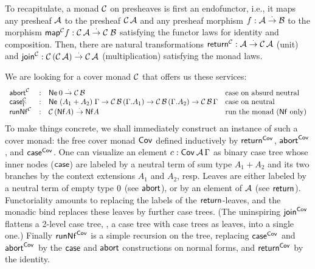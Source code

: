 \documentclass[a4paper,USenglish,cleveref, autoref]{lipics-v2019}
\begin{document}
To recapitulate, a monad $\C$ on presheaves is first an endofunctor,
i.e., it maps any presheaf $\A$ to the presheaf $\C\,\A$ and any
presheaf morphism $f : \A \todot \B$ to the morphism
$\tmap[\C]f: \C\,\A \todot \C\;\B$ satisfying the functor laws for
identity and composition.  Then, there are natural transformations
$\treturn[\C] : \A \todot \C\,\A$ (unit) and
$\tjoin[\C] : \C\,(\C\,\A) \todot \C\,\A$ (multiplication)
satisfying
the monad laws.

We are looking for a cover monad $\C$ that
offers us these services:
\[
\begin{array}{lcl@{\quad}l}
\tabort^\C & : & \tNe\, \tyzero \todot \C\,\B
  & \mbox{case on absurd neutral} \\
\tcase^\C_\Gamma & : & \Ne {(A_1 + A_2)} \Gamma
  \to \C\,\B\,(\cext \Gamma {A_1})
  \to \C\,\B\,(\cext \Gamma {A_2})
  \to \C\,\B\,\Gamma
  & \mbox{case on neutral} \\
\trunNf[\C] & : & \C\,(\tNf A) \todot \tNf A
  & \mbox{run the monad ($\tNf$ only)} \\
\end{array}
\]
To make things concrete,
we shall immediately construct an instance of such a cover monad:
the free cover monad
$\Cov$ defined inductively by $\treturn[\Cov]$, $\tabort^{\Cov}$, and
$\tcase^{\Cov}$.  One can visualize an element $c : \Cov\,\A\,\Gamma$ as
binary case tree whose inner nodes ($\tcase$) are labeled by a neutral term
of sum type $A_1+A_2$ and its two branches by the context extensions $A_1$
and $A_2$, resp.  Leaves are either
labeled by a neutral term of empty type $\tyzero$ (see $\tabort$),
or by an element of $\A$ (see $\treturn$).  Functoriality amounts to
replacing the labels of the $\treturn$-leaves, and the monadic bind replaces
these leaves by further case trees.  (The uninspiring $\tjoin[\Cov]$
flattens a 2-level case tree, \ie, a case tree with case trees as
leaves, into a single one.)
Finally $\trunNf[\Cov]$ is a simple recursion on the tree, replacing $\tcase^{\Cov}$
and $\tabort^{\Cov}$
by the $\tcase$ and $\tabort$ constructions on normal forms, and
$\treturn[\Cov]$ by the identity.
\end{document}
